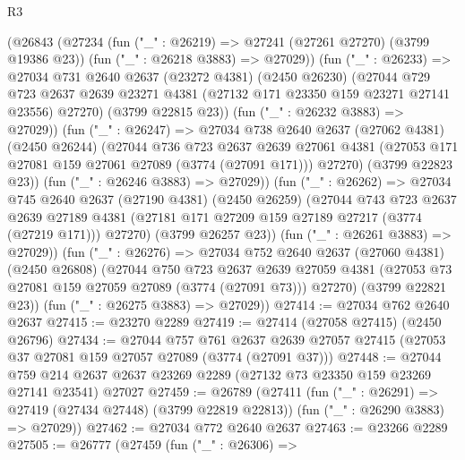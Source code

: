 \begin{lexlean}{R3}
\begin{coremodule}
          (@26843
            (@27234
              (fun ("_" : @26219) => @27241 (@27261 @27270) (@3799 @19386 @23))
              (fun ("_" : @26218 @3883) => @27029))
            (fun ("_" : @26233) =>
            @27034
              @731
              @2640
              @2637
              (@23272 @4381)
              (@2450 @26230)
              (@27044
                @729
                @723
                @2637
                @2639
                @23271
                @4381
                (@27132 @171 @23350 @159 @23271 @27141 @23556)
                @27270)
              (@3799 @22815 @23))
            (fun ("_" : @26232 @3883) => @27029))
          (fun ("_" : @26247) =>
          @27034
            @738
            @2640
            @2637
            (@27062 @4381)
            (@2450 @26244)
            (@27044
              @736
              @723
              @2637
              @2639
              @27061
              @4381
              (@27053 @171 @27081 @159 @27061 @27089 (@3774 (@27091 @171)))
              @27270)
            (@3799 @22823 @23))
          (fun ("_" : @26246 @3883) => @27029))
        (fun ("_" : @26262) =>
        @27034
          @745
          @2640
          @2637
          (@27190 @4381)
          (@2450 @26259)
          (@27044
            @743
            @723
            @2637
            @2639
            @27189
            @4381
            (@27181 @171 @27209 @159 @27189 @27217 (@3774 (@27219 @171)))
            @27270)
          (@3799 @26257 @23))
        (fun ("_" : @26261 @3883) => @27029))
      (fun ("_" : @26276) =>
      @27034
        @752
        @2640
        @2637
        (@27060 @4381)
        (@2450 @26808)
        (@27044
          @750
          @723
          @2637
          @2639
          @27059
          @4381
          (@27053 @73 @27081 @159 @27059 @27089 (@3774 (@27091 @73)))
          @27270)
        (@3799 @22821 @23))
      (fun ("_" : @26275 @3883) => @27029))
@27414 := @27034 @762 @2640 @2637
@27415 := @23270 @2289
@27419 := @27414 (@27058 @27415) (@2450 @26796)
@27434 := @27044
    @757
    @761
    @2637
    @2639
    @27057
    @27415
    (@27053 @37 @27081 @159 @27057 @27089 (@3774 (@27091 @37)))
@27448 := @27044
    @759
    @214
    @2637
    @2637
    @23269
    @2289
    (@27132 @73 @23350 @159 @23269 @27141 @23541)
    @27027
@27459 := @26789
    (@27411
      (fun ("_" : @26291) => @27419 (@27434 @27448) (@3799 @22819 @22813))
      (fun ("_" : @26290 @3883) => @27029))
@27462 := @27034 @772 @2640 @2637
@27463 := @23266 @2289
@27505 := @26777
    (@27459
      (fun ("_" : @26306) =>

\end{coremodule}
\end{lexlean}

